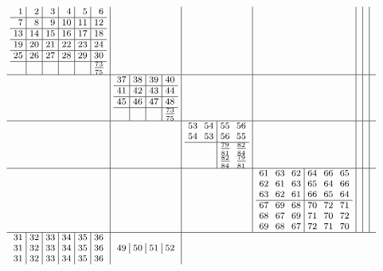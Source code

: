 \documentclass[12pt,a4paper,landscape]{amsart}
\begin{document}
\begin{align*}\footnotesize\arraycolsep3pt
\begin{array}{c|c|c|c|c|c|c}
\begin{array}{r|r|r|r|r|r}%
1&2&3&4&5&6\\\hline%
7&8&9&10&11&12\\\hline%
13&14&15&16&17&18\\\hline%
19&20&21&22&23&24\\\hline%
25&26&27&28&29&30\\\hline%
  &  &  &  &  &^{\underline{73}}_{75}\\%
\end{array}%
&&&&&&\\\hline
&
\begin{array}{r|r|r|r}%
37&38&39&40\\\hline%
41&42&43&44\\\hline%
45&46&47&48\\\hline%
  &  &  &^{\underline{73}}_{75}\\%
\end{array}%
&&&&&\\\hline
&&
\begin{array}{rr|rr}%
53&54&55&56\\%
54&53&56&55\\\hline%
  &  &^{\underline{79}}_{81}&^{\underline{82}}_{84}\\%
  &  &^{\underline{82}}_{84}&^{\underline{79}}_{81}\\%
\end{array}%
&&&&\\\hline
&&&
\begin{array}{rrr|rrr}%
61&63&62&64&66&65\\%
62&61&63&65&64&66\\%
63&62&61&66&65&64\\\hline%
67&69&68&70&72&71\\%
68&67&69&71&70&72\\%
69&68&67&72&71&70\\%
\end{array}%
&&&\\\hline
\begin{array}{r|r|r|r|r|r}%
31&32&33&34&35&36\\%
31&32&33&34&35&36\\%
31&32&33&34&35&36\\%
\end{array}%
&
\begin{array}{r|r|r|r}%
49&50&51&52\\%

\end{array}
\end{array}
\end{align*}
\end{document}
